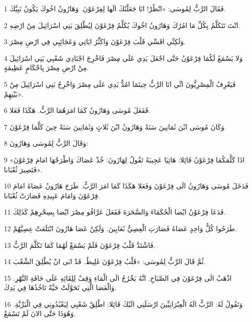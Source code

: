 \par 1 فَقَالَ الرَّبُّ لِمُوسَى: «انْظُرْ! انَا جَعَلْتُكَ الَها لِفِرْعَوْنَ. وَهَارُونُ اخُوكَ يَكُونُ نَبِيَّكَ.
\par 2 انْتَ تَتَكَلَّمُ بِكُلِّ مَا امُرُكَ وَهَارُونُ اخُوكَ يُكَلِّمُ فِرْعَوْنَ لِيُطْلِقَ بَنِي اسْرَائِيلَ مِنْ ارْضِهِ.
\par 3 وَلَكِنِّي اقَسِّي قَلْبَ فِرْعَوْنَ وَاكَثِّرُ ايَاتِي وَعَجَائِبِي فِي ارْضِ مِصْرَ.
\par 4 وَلا يَسْمَعُ لَكُمَا فِرْعَوْنُ حَتَّى اجْعَلَ يَدِي عَلَى مِصْرَ فَاخْرِجَ اجْنَادِي شَعْبِي بَنِي اسْرَائِيلَ مِنْ ارْضِ مِصْرَ بِاحْكَامٍ عَظِيمَةٍ.
\par 5 فَيَعْرِفُ الْمِصْرِيُّونَ انِّي انَا الرَّبُّ حِينَمَا امُدُّ يَدِي عَلَى مِصْرَ وَاخْرِجُ بَنِي اسْرَائِيلَ مِنْ بَيْنِهِمْ».
\par 6 فَفَعَلَ مُوسَى وَهَارُونُ كَمَا امَرَهُمَا الرَّبُّ. هَكَذَا فَعَلا.
\par 7 وَكَانَ مُوسَى ابْنَ ثَمَانِينَ سَنَةً وَهَارُونُ ابْنَ ثَلاثٍ وَثَمَانِينَ سَنَةً حِينَ كَلَّمَا فِرْعَوْنَ.
\par 8 وَقَالَ الرَّبُّ لِمُوسَى وَهَارُونَ:
\par 9 «اذَا كَلَّمَكُمَا فِرْعَوْنُ قَائِلا: هَاتِيَا عَجِيبَةً تَقُولُ لِهَارُونَ: خُذْ عَصَاكَ وَاطْرَحْهَا امَامَ فِرْعَوْنَ فَتَصِيرَ ثُعْبَانا».
\par 10 فَدَخَلَ مُوسَى وَهَارُونُ الَى فِرْعَوْنَ وَفَعَلا هَكَذَا كَمَا امَرَ الرَّبُّ. طَرَحَ هَارُونُ عَصَاهُ امَامَ فِرْعَوْنَ وَامَامَ عَبِيدِهِ فَصَارَتْ ثُعْبَانا.
\par 11 فَدَعَا فِرْعَوْنُ ايْضا الْحُكَمَاءَ وَالسَّحَرَةَ فَفَعَلَ عَرَّافُو مِصْرَ ايْضا بِسِحْرِهِمْ كَذَلِكَ.
\par 12 طَرَحُوا كُلُّ وَاحِدٍ عَصَاهُ فَصَارَتِ الْعِصِيُّ ثَعَابِينَ. وَلَكِنْ عَصَا هَارُونَ ابْتَلَعَتْ عِصِيَّهُمْ.
\par 13 فَاشْتَدَّ قَلْبُ فِرْعَوْنَ فَلَمْ يَسْمَعْ لَهُمَا كَمَا تَكَلَّمَ الرَّبُّ.
\par 14 ثُمَّ قَالَ الرَّبُّ لِمُوسَى: «قَلْبُ فِرْعَوْنَ غَلِيظٌ. قَدْ ابَى انْ يُطْلِقَ الشَّعْبَ.
\par 15 اذْهَبْ الَى فِرْعَوْنَ فِي الصَّبَاحِ. انَّهُ يَخْرُجُ الَى الْمَاءِ وَقِفْ لِلِقَائِهِ عَلَى حَافَةِ النَّهْرِ. وَالْعَصَا الَّتِي تَحَوَّلَتْ حَيَّةً تَاخُذُهَا فِي يَدِكَ.
\par 16 وَتَقُولُ لَهُ: الرَّبُّ الَهُ الْعِبْرَانِيِّينَ ارْسَلَنِي الَيْكَ قَائِلا: اطْلِقْ شَعْبِي لِيَعْبُدُونِي فِي الْبَرِّيَّةِ. وَهُوَذَا حَتَّى الانَ لَمْ تَسْمَعْ.
